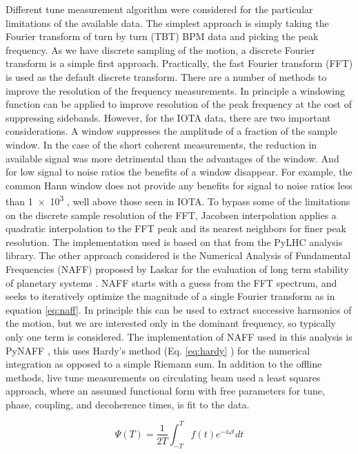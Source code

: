 Different tune measurement algorithm were considered for the particular limitations of the available data. The simplest approach is simply taking the Fourier transform of turn by turn (TBT) BPM data and picking the peak frequency. As we have discrete sampling of the motion, a discrete Fourier transform is a simple first approach. Practically, the fast Fourier transform (FFT) is used as the default discrete transform. There are a number of methods to improve the resolution of the frequency measurements. In principle a windowing function can be applied to improve resolution of the peak frequency at the cost of suppressing sidebands. However, for the IOTA data, there are two important considerations. A window suppresses the amplitude of a fraction of the sample window. In the case of the short coherent measurements, the reduction in available signal was more detrimental than the advantages of the window. And for low signal to noise ratios the benefits of a window disappear. For example, the common Hann window does not provide any benefits for signal to noise ratios less than \num{1e3} \cite{bartoliniAlgorithmsPreciseDetermination1996}, well above those seen in IOTA. To bypass some of the limitations on the discrete sample resolution of the FFT, Jacobsen interpolation \cite{jacobsenLocalInterpolationDFT} applies a quadratic interpolation to the FFT peak and its nearest neighbors for finer peak resolution. The implementation used is based on that from the PyLHC \cite{cernomcteamPyLHC} analysis library. The other approach considered is the Numerical Analysis of Fundamental Frequencies (NAFF) proposed by Laskar for the evaluation of long term stability of planetary systems \cite{laskarMeasureChaosNumerical1992}. NAFF starts with a guess from the FFT spectrum, and seeks to iteratively optimize the magnitude of a single Fourier transform as in equation \ref{eq:naff}. In principle this can be used to extract successive harmonics of the motion, but we are interested only in the dominant frequency, so typically only one term is considered. The implementation of NAFF used in this analysis is PyNAFF \cite{zisopoulosPZisoPyNAFF2023}, this uses Hardy's method (Eq. \ref{eq:hardy} \cite[p.151]{whittakerCalculusObservations1924}) for the numerical integration as opposed to a simple Riemann sum. In addition to the offline methods, live tune measurements on circulating beam used a least squares approach, where an assumed functional form with free parameters for tune, phase, coupling, and decoherence times, is fit to the data.

\begin{equation}
	\Psi(T) = \frac{1}{2T}\int_{-T}^{T}f(t)e^{-i\omega t}dt
	\label{eq:naff}
\end{equation}

